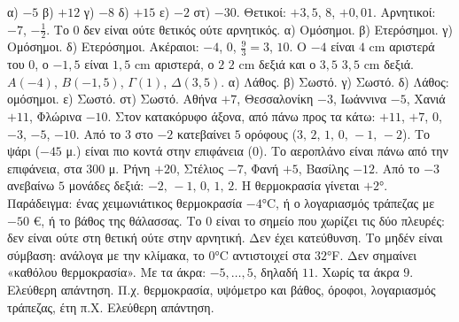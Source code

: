  α) $-5$ \quad β) $+12$ \quad γ) $-8$ \quad δ) $+15$ \quad ε) $-2$ \quad στ) $-30$.
 Θετικοί: $+3{,}5$, $8$, $+0{,}01$. Αρνητικοί: $-7$, $-\frac{1}{2}$. Το $0$ δεν είναι ούτε θετικός ούτε αρνητικός.
 α) Ομόσημοι. β) Ετερόσημοι. γ) Ομόσημοι. δ) Ετερόσημοι.
 Ακέραιοι: $-4$, $0$, $\frac{9}{3}=3$, $10$.
 Ο $-4$ είναι $4$ cm αριστερά του $0$, ο $-1{,}5$ είναι $1{,}5$ cm αριστερά, ο $2$ $2$ cm δεξιά και ο $3{,}5$ $3{,}5$ cm δεξιά.
 $A(-4)$, $B(-1{,}5)$, $\Gamma(1)$, $\Delta(3{,}5)$.
 α) Λάθος. β) Σωστό. γ) Σωστό. δ) Λάθος: ομόσημοι. ε) Σωστό. στ) Σωστό.
 Αθήνα $+7$, Θεσσαλονίκη $-3$, Ιωάννινα $-5$, Χανιά $+11$, Φλώρινα $-10$. Στον κατακόρυφο άξονα, από πάνω προς τα κάτω: $+11$, $+7$, $0$, $-3$, $-5$, $-10$.
 Από το $3$ στο $-2$ κατεβαίνει $5$ ορόφους ($3,\,2,\,1,\,0,\,-1,\,-2$).
 Το ψάρι ($-45$ μ.) είναι πιο κοντά στην επιφάνεια ($0$). Το αεροπλάνο είναι πάνω από την επιφάνεια, στα $300$ μ.
 Ρήνη $+20$, Στέλιος $-7$, Φανή $+5$, Βασίλης $-12$.
 Από το $-3$ ανεβαίνω $5$ μονάδες δεξιά: $-2,\,-1,\,0,\,1,\,2$. Η θερμοκρασία γίνεται $+2$°.
 Παράδειγμα: ένας χειμωνιάτικος θερμοκρασία $-4$°C, ή ο λογαριασμός τράπεζας με $-50$ €, ή το βάθος της θάλασσας.
 Το $0$ είναι το σημείο που χωρίζει τις δύο πλευρές: δεν είναι ούτε στη θετική ούτε στην αρνητική. Δεν έχει κατεύθυνση.
 Το μηδέν είναι σύμβαση: ανάλογα με την κλίμακα, το $0$°C αντιστοιχεί στα $32$°F. Δεν σημαίνει «καθόλου θερμοκρασία».
 Με τα άκρα: $-5,\dots,5$, δηλαδή $11$. Χωρίς τα άκρα $9$.
 Ελεύθερη απάντηση. Π.χ. θερμοκρασία, υψόμετρο και βάθος, όροφοι, λογαριασμός τράπεζας, έτη π.Χ.
 Ελεύθερη απάντηση.
